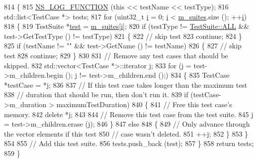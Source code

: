 \begin{DoxyCode}
814 \{
815   \hyperlink{log-macros-disabled_8h_a90b90d5bad1f39cb1b64923ea94c0761}{NS\_LOG\_FUNCTION} (\textcolor{keyword}{this} << testName << testType);
816   std::list<TestCase *> tests;
817   \textcolor{keywordflow}{for} (uint32\_t \hyperlink{bernuolliDistribution_8m_a6f6ccfcf58b31cb6412107d9d5281426}{i} = 0; \hyperlink{bernuolliDistribution_8m_a6f6ccfcf58b31cb6412107d9d5281426}{i} < \hyperlink{classns3_1_1TestRunnerImpl_ad9c1c25956dd113f924cfcdad60f236c}{m\_suites}.size (); ++\hyperlink{bernuolliDistribution_8m_a6f6ccfcf58b31cb6412107d9d5281426}{i})
818     \{
819       TestSuite *\hyperlink{main-test-sync_8cc_a708a4c1a4d0c4acc4c447310dd4db27f}{test} = \hyperlink{classns3_1_1TestRunnerImpl_ad9c1c25956dd113f924cfcdad60f236c}{m\_suites}[\hyperlink{bernuolliDistribution_8m_a6f6ccfcf58b31cb6412107d9d5281426}{i}];
820       \textcolor{keywordflow}{if} (testType != \hyperlink{classns3_1_1TestSuite_a1ebfcab34ec8161e085e8e3a1855eae0ad8b114e201710e2d7d6b9d39564f585a}{TestSuite::ALL} && test->GetTestType () != testType)
821         \{
822           \textcolor{comment}{// skip test}
823           \textcolor{keywordflow}{continue};
824         \}
825       \textcolor{keywordflow}{if} (testName != \textcolor{stringliteral}{""} && test->GetName () != testName)
826         \{
827           \textcolor{comment}{// skip test}
828           \textcolor{keywordflow}{continue};
829         \}
830 
831       \textcolor{comment}{// Remove any test cases that should be skipped.}
832       std::vector<TestCase *>::iterator j;
833       \textcolor{keywordflow}{for} (j = test->m\_children.begin (); j != test->m\_children.end ();)
834         \{
835           TestCase *testCase = *j;
836 
837           \textcolor{comment}{// If this test case takes longer than the maximum test}
838           \textcolor{comment}{// duration that should be run, then don't run it.}
839           \textcolor{keywordflow}{if} (testCase->m\_duration > maximumTestDuration)
840             \{
841               \textcolor{comment}{// Free this test case's memory.}
842               \textcolor{keyword}{delete} *j;
843 
844               \textcolor{comment}{// Remove this test case from the test suite.}
845               j = test->m\_children.erase (j);
846             \}
847           \textcolor{keywordflow}{else}
848             \{
849               \textcolor{comment}{// Only advance through the vector elements if this test}
850               \textcolor{comment}{// case wasn't deleted.}
851               ++j;
852             \}
853         \}
854 
855       \textcolor{comment}{// Add this test suite.}
856       tests.push\_back (test);
857     \}
858   \textcolor{keywordflow}{return} tests;
859 \}
\end{DoxyCode}


